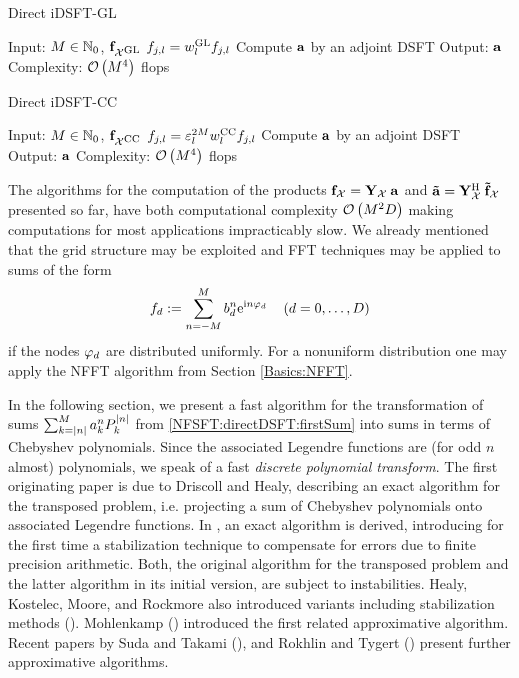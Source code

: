 \begin{algorithm}[t]
  \caption{Direct iDSFT-GL}
  \label{NFSFT:directIDSFTGL}    
  \begin{algorithmic}
    \STATE Input: $M \in \mathbb{N}_{0}$, $\mathbf{f}_{\mathcal{X}^{\mbox{\scriptsize\rm{GL}}}}$
    \STATE
        \STATE $f_{j,l} = w^{\mbox{\scriptsize\rm{GL}}}_{l} f_{j,l}$ 
      \ENDFOR
    \ENDFOR
    \STATE Compute $\mathbf{a}$ by an adjoint DSFT
    \STATE
    \STATE Output: $\mathbf{a}$
    \STATE Complexity: $\mathcal{O}\left(M^4\right)$ flops
  \end{algorithmic}
\end{algorithm}
\begin{algorithm}[t]
  \caption{Direct iDSFT-CC}
  \label{NFSFT:directIDSFTCC}    
  \begin{algorithmic}
    \STATE Input: $M \in \mathbb{N}_{0}$, $\mathbf{f}_{\mathcal{X}^{\mbox{\scriptsize\rm{CC}}}}$
    \STATE
        \STATE $f_{j,l} = \varepsilon_{l}^{2M} w^{\mbox{\scriptsize\rm{CC}}}_{l} f_{j,l}$ 
      \ENDFOR
    \ENDFOR
    \STATE Compute $\mathbf{a}$ by an adjoint DSFT
    \STATE
    \STATE Output: $\mathbf{a}$
    \STATE Complexity: $\mathcal{O}\left(M^4\right)$ flops
  \end{algorithmic}
\end{algorithm}

The algorithms for the computation of the products $\mathbf{f}_{\mathcal{X}} = \mathbf{Y}_{\mathcal{X}} \: \mathbf{a}$ and $\mathbf{\tilde{a}} = \mathbf{Y}_{\mathcal{X}}^{\text{\rm{H}}} \: \mathbf{\tilde{f}}_{\mathcal{X}}$ presented so far, have both computational complexity $\mathcal{O}\left(M^2D\right)$ making computations for most applications impracticably slow. We already mentioned that the grid structure may be exploited and FFT 
techniques may be applied to sums of the form
\[
  f_{d} := \sum_{n = -M}^M b^n_d \mbox{\rm{e}}^{\mbox{\scriptsize\rm{i}} n \varphi_{d}} \quad \left(d = 0,\ldots,D\right)
\]
if the nodes $\varphi_d$ are distributed uniformly. For a nonuniform distribution one may apply the NFFT algorithm from Section \ref{Basics:NFFT}. 

In the following section, we present a fast algorithm for the transformation of sums $\sum_{k=\left\vert n\right\vert}^M a_{k}^n P_{k}^{\left\vert n\right\vert}$ from \eqref{NFSFT:directDSFT:firstSum} into sums in terms of Chebyshev polynomials. Since the associated Legendre functions are (for odd $n$ almost) polynomials, we speak of a fast \emph{discrete polynomial transform}. The first originating
paper \cite{drhe} is due to Driscoll and Healy, describing an exact algorithm for the transposed
problem, i.e. projecting a sum of Chebyshev polynomials onto associated Legendre functions. In \cite{postta97}, an exact algorithm is derived, introducing for the first time a stabilization technique to compensate for errors due to finite precision arithmetic. Both, the original algorithm for the transposed problem and the latter algorithm in its initial version, are subject to instabilities. Healy, Kostelec, Moore, and Rockmore also introduced variants including stabilization methods (\cite{HeRoKoMo}). Mohlenkamp (\cite{Mo99}) introduced the first related approximative algorithm. Recent papers by Suda and Takami (\cite{SuTa01}), and Rokhlin and Tygert (\cite{roty}) present further approximative algorithms. 

